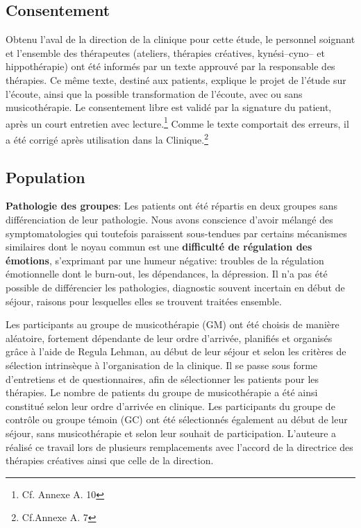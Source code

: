  \subsection{Consentement}
 Obtenu l'aval de la direction de la
 clinique pour cette étude,  le personnel soignant et l'ensemble des
 thérapeutes (ateliers, thérapies créatives, kynési--cyno--
 et hippothérapie) ont été  informés par un texte approuvé par la responsable des thérapies.
 Ce même texte, destiné aux
 patients, explique le projet de l'étude sur l'écoute, ainsi que la possible transformation de l'écoute,
 avec ou sans musicothérapie.
 Le consentement libre est validé par la signature du patient, après
 un court entretien avec lecture.\footnote{Cf. Annexe A. 10}
 Comme le texte comportait des erreurs, il a été 
 corrigé après utilisation dans la Clinique.\footnote{Cf.Annexe A. 7}
 
 
 \subsection{Population}
 
 
 \textbf{ Pathologie des groupes}: Les patients ont été répartis en deux groupes sans différenciation de
 leur pathologie. Nous avons conscience d'avoir mélangé des symptomatologies qui
 toutefois paraissent
 sous-tendues par
 certains mécanismes
 similaires dont le
 noyau commun est une
 \textbf{difficulté de
 	régulation des
 	émotions},
 s'exprimant par une
 humeur négative: 
 troubles de la régulation émotionnelle
 dont le burn-out, les dépendances, la dépression.
 Il n'a pas été
 possible de différencier les pathologies, 
 diagnostic souvent incertain en début de séjour, raisons pour lesquelles elles
 se trouvent traitées ensemble.
 
 
 
   Les participants au groupe de musicothérapie (GM) ont été choisis de manière aléatoire, fortement 
   dépendante de leur ordre d'arrivée, planifiés et 
   organisés grâce à l'aide de Regula Lehman, au début de leur 
  séjour et selon les critères de sélection intrinsèque à  l'organisation de la clinique.  Il se passe  sous  
  forme d'entretiens et de questionnaires, afin de sélectionner les patients 
  pour les thérapies.
  Le nombre de patients du groupe de musicothérapie a été ainsi constitué selon leur ordre d'arrivée en 
  clinique.
  Les participants du groupe de contrôle ou groupe témoin (GC) ont été sélectionnés également au début 
  de leur séjour, sans 
 musicothérapie et  selon leur souhait de participation. 
 L'auteure a réalisé ce travail  lors de 
 plusieurs 
 remplacements avec l'accord de la directrice des thérapies créatives ainsi que celle de la direction.
 

